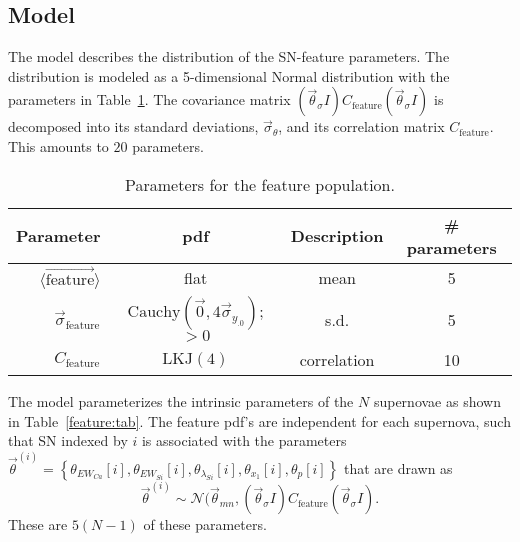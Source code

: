 \documentclass{aastex61}   	%
\begin{document}
\subsection{Model}
The model describes the distribution of the SN-feature parameters.  The distribution is modeled as a
5-dimensional Normal distribution
with the parameters in Table~\ref{population:tab}.
The covariance matrix $(\vec{\theta}_{\sigma}I) C_{\text{feature}}  (\vec{\theta}_{\sigma}I)$ is
decomposed into its standard deviations, $\vec{\sigma}_{\theta}$,
and its correlation matrix $C_{\text{feature}}$.
This amounts to $20$ parameters.
\begin{table}
\begin{center}
\caption{Parameters for the feature population. \label{population:tab}}
\begin{tabular}{rccc}
\hline
Parameter & pdf & Description & \# parameters\\ \hline
$\langle \overrightarrow{\text{feature}}\rangle$ & flat  &  mean & 5\\
$\vec{\sigma}_{\text{feature}}$ & $\text{Cauchy}(\vec{0},4\vec{\sigma}_{y_{.0}})$; $>0$  &  s.d. & 5\\
$C_{\text{feature}}$ & $\text{LKJ}(4)$ &  correlation & 10\\
\hline
\end{tabular}
\end{center}
\end{table}

The model parameterizes the intrinsic parameters of the $N$ supernovae as shown in Table~\ref{feature:tab}.
The feature pdf's are independent for each supernova, such that SN indexed by $i$ is associated with the parameters
$\vec{\theta}^{(i)}=\left\{\theta_{EW_{Ca}}[i], \theta_{EW_{Si}}[i], \theta_{\lambda_{Si}}[i], \theta_{x_1}[i], \theta_{p}[i] \right\}$
that are drawn as
\begin{equation}
\vec{\theta}^{(i)} \sim \mathcal{N}(\vec{\theta}_{\mathit{mn}}, (\vec{\theta}_{\sigma}I) C_{\text{feature}}  (\vec{\theta}_{\sigma}I).
\label{feature:pdf}
\end{equation}
These are $5(N-1)$ of these parameters.
\end{document}
